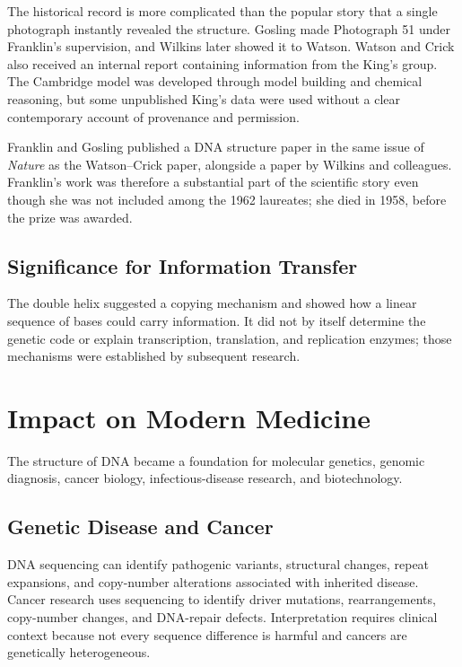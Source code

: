 The historical record is more complicated than the popular story that a single photograph instantly revealed the structure. Gosling made Photograph 51 under Franklin's supervision, and Wilkins later showed it to Watson. Watson and Crick also received an internal report containing information from the King's group. The Cambridge model was developed through model building and chemical reasoning, but some unpublished King's data were used without a clear contemporary account of provenance and permission.

Franklin and Gosling published a DNA structure paper in the same issue of \textit{Nature} as the Watson--Crick paper, alongside a paper by Wilkins and colleagues. Franklin's work was therefore a substantial part of the scientific story even though she was not included among the 1962 laureates; she died in 1958, before the prize was awarded.

\subsection{Significance for Information Transfer}

The double helix suggested a copying mechanism and showed how a linear sequence of bases could carry information. It did not by itself determine the genetic code or explain transcription, translation, and replication enzymes; those mechanisms were established by subsequent research.

\section{Impact on Modern Medicine}

The structure of DNA became a foundation for molecular genetics, genomic diagnosis, cancer biology, infectious-disease research, and biotechnology.

\subsection{Genetic Disease and Cancer}

DNA sequencing can identify pathogenic variants, structural changes, repeat expansions, and copy-number alterations associated with inherited disease. Cancer research uses sequencing to identify driver mutations, rearrangements, copy-number changes, and DNA-repair defects. Interpretation requires clinical context because not every sequence difference is harmful and cancers are genetically heterogeneous.

